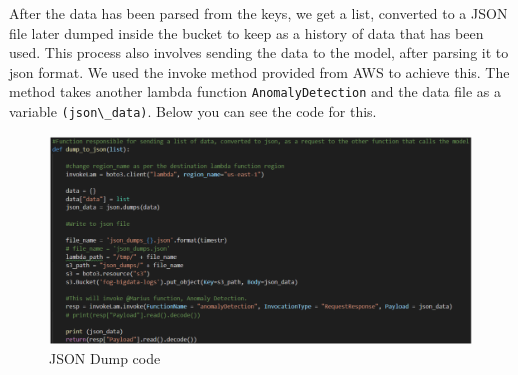 After the data has been parsed from the keys, we get a list, converted to a JSON file later dumped inside the bucket to keep as a history of data that has been used. 
This process also involves sending the data to the model, after parsing it to json format. We used the invoke method provided from AWS to achieve this. The method takes another lambda function \verb|AnomalyDetection| and the data file as a variable \verb|(json\_data)|. Below you can see the code for this.

\begin{figure}[h!]
    \includegraphics[width=1\textwidth]{images/json-dump-code.png}
    \caption{JSON Dump code}
    \label{fig:json_dump_code}
\end{figure}

